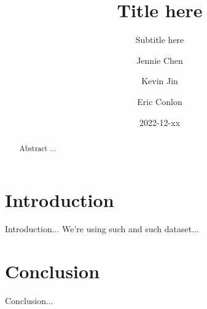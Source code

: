 \documentclass[format=sigconf, nonacm=true, review=true, screen=true]{acmart}
\title{Title here}
\subtitle{Subtitle here}
\author{Jennie Chen}
\author{Kevin Jin}
\author{Eric Conlon}
\date{2022-12-xx}
\begin{document}
\begin{abstract}

Abstract ...

\end{abstract}

\maketitle

\section{Introduction}

Introduction... We're using such and such dataset... \cite{verwoert2022dataset}

\section{Conclusion}

Conclusion...



\end{document}

